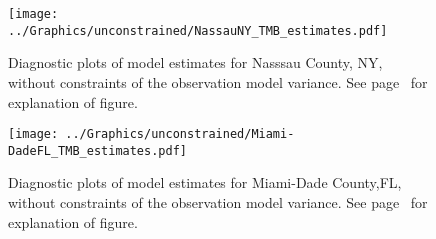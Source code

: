 \documentclass[12pt,letterpaper]{article}
\begin{document}
\begin{appendices}
\begin{figure}[h!]
\begin{center}
\texttt{[image: ../Graphics/unconstrained/NassauNY\_TMB\_estimates.pdf]}
\end{center}
\caption{\label{fig:estsNaNYu}
Diagnostic plots of model estimates for Nasssau County, NY, 
without constraints of the observation model variance. 
See page~\pageref{pp:diagexpl} for explanation of figure.
}
\end{figure}
\clearpage

\begin{figure}
\begin{center}
\texttt{[image: ../Graphics/unconstrained/Miami-DadeFL\_TMB\_estimates.pdf]}
\end{center}
\caption{\label{fig:estsMDFLu}
Diagnostic plots of model estimates for Miami-Dade County,FL,
without constraints of the observation model variance. 
See page~\pageref{pp:diagexpl} for explanation of figure.
}
\end{figure}

\end{appendices}
\end{document}
